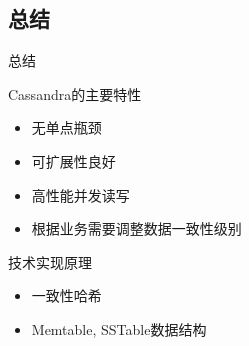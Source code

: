 \documentclass{beamer}
\begin{document}
\begin{CJK}{UTF8}{gbsn}


\section*{总结}

\begin{frame}{总结}
  \begin{block}{Cassandra的主要特性}
    \begin{itemize}
      \item {无单点瓶颈}
      \item {可扩展性良好}
      \item {高性能并发读写}
      \item {根据业务需要调整数据一致性级别}
    \end{itemize}    
  \end{block}
  \begin{block}{技术实现原理}
  \begin{itemize}
    \item {一致性哈希}
    \item {Memtable, SSTable数据结构}
  \end{itemize}
  \end{block}
\end{frame}


\end{CJK}
\end{document}
